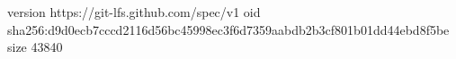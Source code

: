 version https://git-lfs.github.com/spec/v1
oid sha256:d9d0ecb7cccd2116d56bc45998ec3f6d7359aabdb2b3cf801b01dd44ebd8f5be
size 43840
